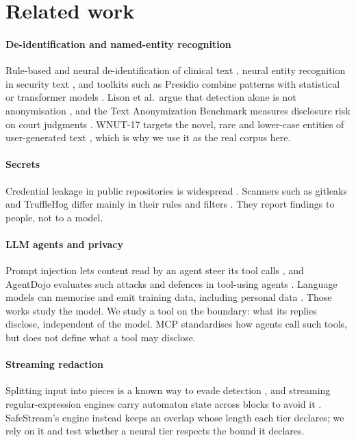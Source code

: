 \section{Related work}\label{sec:related}

\paragraph{De-identification and named-entity recognition} Rule-based and neural de-identification of clinical text \cite{norgeot2020philter,dernoncourt2017deid}, neural entity recognition in security text \cite{simran2020cybersecner}, and toolkits such as Presidio \cite{presidio,presidioresearch} combine patterns with statistical or transformer models \cite{devlin2019bert,sanh2019distilbert,zaratiana2024gliner}. Lison et al.\ argue that detection alone is not anonymisation \cite{lison2021anonymisation}, and the Text Anonymization Benchmark measures disclosure risk on court judgments \cite{pilan2022tab}. WNUT-17 targets the novel, rare and lower-case entities of user-generated text \cite{derczynski2017wnut}, which is why we use it as the real corpus here.

\paragraph{Secrets} Credential leakage in public repositories is widespread \cite{meli2019git}. Scanners such as gitleaks and TruffleHog \cite{gitleaks,trufflehog} differ mainly in their rules and filters \cite{basak2023comparative}. They report findings to people, not to a model.

\paragraph{LLM agents and privacy} Prompt injection lets content read by an agent steer its tool calls \cite{greshake2023injection}, and AgentDojo evaluates such attacks and defences in tool-using agents \cite{debenedetti2024agentdojo}. Language models can memorise and emit training data, including personal data \cite{carlini2021extracting,lukas2023pii}. Those works study the model. We study a tool on the boundary: what its replies disclose, independent of the model. MCP \cite{mcpspec} standardises how agents call such tools, but does not define what a tool may disclose.

\paragraph{Streaming redaction} Splitting input into pieces is a known way to evade detection \cite{ptacek1998insertion}, and streaming regular-expression engines carry automaton state across blocks to avoid it \cite{wang2019hyperscan}. SafeStream's engine instead keeps an overlap whose length each tier declares; we rely on it and test whether a neural tier respects the bound it declares.
